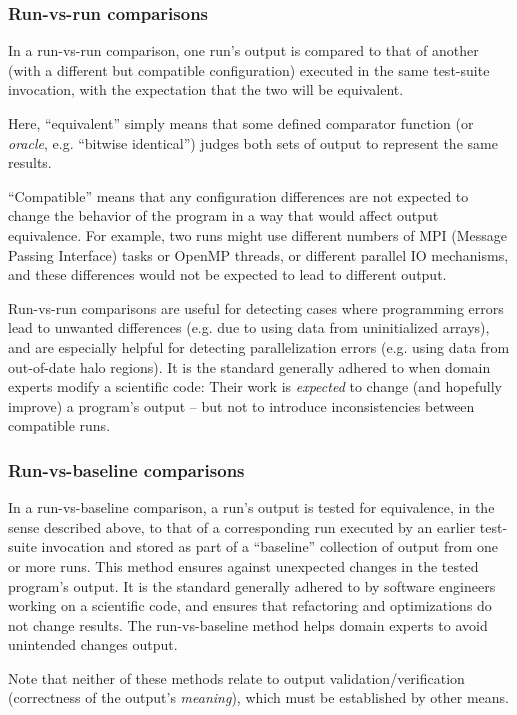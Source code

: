 \documentclass[conference]{IEEEtran}
\begin{document}
\subsubsection{Run-vs-run comparisons}

In a run-vs-run comparison, one run's output is compared to that of another (with a different but compatible configuration) executed in the same test-suite invocation, with the expectation that the two will be equivalent.

Here, ``equivalent'' simply means that some defined comparator function (or \emph{oracle}, e.g. ``bitwise identical'') judges both sets of output to represent the same results.

``Compatible'' means that any configuration differences are not expected to change the behavior of the program in a way that would affect output equivalence. For example, two runs might use different numbers of MPI (Message Passing Interface) tasks or OpenMP threads, or different parallel IO mechanisms, and these differences would not be expected to lead to different output.

Run-vs-run comparisons are useful for detecting cases where programming errors lead to unwanted differences (e.g. due to using data from uninitialized arrays), and are especially helpful for detecting parallelization errors (e.g. using data from out-of-date halo regions). It is the standard generally adhered to when domain experts modify a scientific code: Their work is \emph{expected} to change (and hopefully improve) a program's output -- but not to introduce inconsistencies between compatible runs.

\subsubsection{Run-vs-baseline comparisons}

In a run-vs-baseline comparison, a run's output is tested for equivalence, in the sense described above, to that of a corresponding run executed by an earlier test-suite invocation and stored as part of a ``baseline'' collection of output from one or more runs. This method ensures against unexpected changes in the tested program's output. It is the standard generally adhered to by software engineers working on a scientific code, and ensures that refactoring and optimizations do not change results. The run-vs-baseline method helps domain experts to avoid unintended changes output.

Note that neither of these methods relate to output validation/verification (correctness of the output's \emph{meaning}), which must be established by other means.
\end{document}
